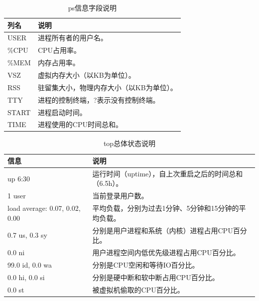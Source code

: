 \begin{table}[H]
	\centering
	\begin{tabular}{|l|l|}
		\hline
		\textbf{列名} & \textbf{说明}           \\
		\hline
		USER        & 进程所有者的用户名。            \\
		\hline
		\%CPU       & CPU占用率。               \\
		\hline
		\%MEM       & 内存占用率。                \\
		\hline
		VSZ         & 虚拟内存大小（以KB为单位）。       \\
		\hline
		RSS         & 驻留集大小，物理内存大小（以KB为单位）。 \\
		\hline
		TTY         & 进程的控制终端，?表示没有控制终端。    \\
		\hline
		START       & 进程启动时间。               \\
		\hline
		TIME        & 进程使用的CPU时间总和。         \\
		\hline
	\end{tabular}
	\caption{ps信息字段说明}
\end{table}

\begin{table}[H]
	\centering
	\begin{tabular}{|l|l|}
		\hline
		\textbf{信息}                    & \textbf{说明}                      \\
		\hline
		up 6:30                        & 运行时间（uptime），自上次重启之后的时间总和（6.5h）。 \\
		\hline
		1 user                         & 当前登录用户数。                         \\
		\hline
		load average: 0.07, 0.02, 0.00 & 平均负载，分别为过去1分钟、5分钟和15分钟的平均负载。     \\
		\hline
		0.7 us, 0.3 sy                 & 分别是用户进程和系统（内核）进程占用CPU百分比。        \\
		\hline
		0.0 ni                         & 用户进程空间内低优先级进程占用CPU百分比。           \\
		\hline
		99.0 id, 0.0 wa                & 分别是CPU空闲和等待IO百分比。                \\
		\hline
		0.0 hi, 0.0 si                 & 分别是硬中断和软中断占用CPU百分比。              \\
		\hline
		0.0 st                         & 被虚拟机偷取的CPU百分比。                   \\
		\hline
	\end{tabular}
	\caption{top总体状态说明}
\end{table}

